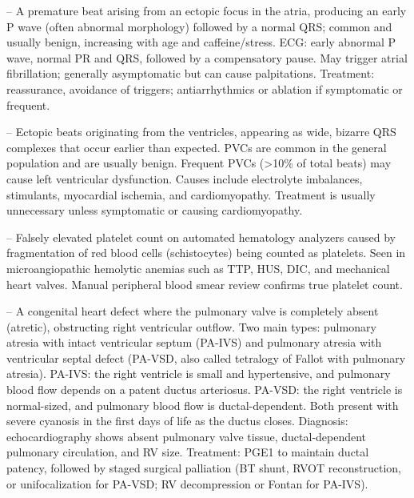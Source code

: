 -- A premature beat arising from an ectopic focus in the atria, producing an early P wave (often abnormal morphology) followed by a normal QRS; common and usually benign, increasing with age and caffeine/stress. ECG: early abnormal P wave, normal PR and QRS, followed by a compensatory pause. May trigger atrial fibrillation; generally asymptomatic but can cause palpitations. Treatment: reassurance, avoidance of triggers; antiarrhythmics or ablation if symptomatic or frequent.

-- Ectopic beats originating from the ventricles, appearing as wide, bizarre QRS complexes that occur earlier than expected. PVCs are common in the general population and are usually benign. Frequent PVCs (>10\% of total beats) may cause left ventricular dysfunction. Causes include electrolyte imbalances, stimulants, myocardial ischemia, and cardiomyopathy. Treatment is usually unnecessary unless symptomatic or causing cardiomyopathy.

-- Falsely elevated platelet count on automated hematology analyzers caused by fragmentation of red blood cells (schistocytes) being counted as platelets. Seen in microangiopathic hemolytic anemias such as TTP, HUS, DIC, and mechanical heart valves. Manual peripheral blood smear review confirms true platelet count.

-- A congenital heart defect where the pulmonary valve is completely absent (atretic), obstructing right ventricular outflow. Two main types: pulmonary atresia with intact ventricular septum (PA-IVS) and pulmonary atresia with ventricular septal defect (PA-VSD, also called tetralogy of Fallot with pulmonary atresia). PA-IVS: the right ventricle is small and hypertensive, and pulmonary blood flow depends on a patent ductus arteriosus. PA-VSD: the right ventricle is normal-sized, and pulmonary blood flow is ductal-dependent. Both present with severe cyanosis in the first days of life as the ductus closes. Diagnosis: echocardiography shows absent pulmonary valve tissue, ductal-dependent pulmonary circulation, and RV size. Treatment: PGE1 to maintain ductal patency, followed by staged surgical palliation (BT shunt, RVOT reconstruction, or unifocalization for PA-VSD; RV decompression or Fontan for PA-IVS).

